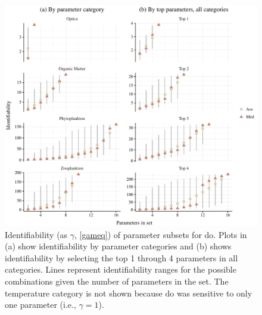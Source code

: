 \documentclass[letterpaper,12pt,oneside]{article}\usepackage[]{graphicx}\usepackage[]{color}
\makeatletter
\def\maxwidth{ %
  \ifdim\Gin@nat@width>\linewidth
    \linewidth
  \else
    \Gin@nat@width
  \fi
}
\makeatother
\begin{document}
\begin{figure}[!ht]

{\centering \includegraphics[width=\maxwidth]{figs/identplo-1} 

}

\caption{Identifiability (as $\gamma$, \cref{gameq}) of parameter subsets for \ac{do}.  Plots in (a) show identifiability by parameter categories and (b) shows identifiability by selecting the top 1 through 4 parameters in all categories.  Lines represent identifiability ranges for the possible combinations given the number of parameters in the set.  The temperature category is not shown because \ac{do} was sensitive to only one parameter (i.e., $\gamma = 1$).}\label{fig:identplo}
\end{figure}
\end{document}
